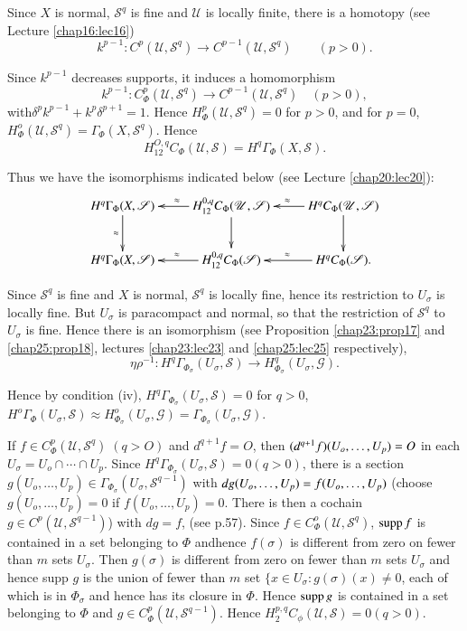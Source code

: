 Since $X$ is normal, $\mathscr{S}^q$ is fine and $\mathscr{U}$ is
locally finite, there is a homotopy (see Lecture \ref{chap16:lec16}) 
$$
k^{p-1}:C^p(\mathscr{U},\mathscr{S}^q) \to 
C^{p-1}(\mathscr{U},\mathscr{S}^q) \qquad (p>0). 
$$

Since $k^{p-1}$ decreases supports, it induces a homomorphism
$$
k^{p-1} : C^p_{\Phi} (\mathscr{U}, \mathscr{S}^q) \to C^{p-1}
(\mathscr{U}, \mathscr{S}^q) \quad (p > 0),
$$
with\pageoriginale $\delta^p k^{p-1} + k^p \delta^{p+1} = 1$. Hence $H^p_\Phi
(\mathscr{U}, \mathscr{S}^q)=0$ for $p>0$, and for $p=0$, $H^o_ \Phi
(\mathscr{U},\mathscr{S}^q)= \Gamma _\Phi (X, \mathscr{S}^q)$. Hence 
$$
H^{O,q}_{12}C_ \Phi (\mathscr{U},\mathscr{S})=H^q \Gamma _ \Phi
(X,\mathscr{S}). 
$$

Thus we have the isomorphisms indicated below (see Lecture
\ref{chap20:lec20}): 
\[
\xymatrix{
H^q\Gamma_{\Phi} (X,\mathscr{S}) \ar[d]_{\approx} & H^{0,q}_{12}
C_{\Phi} (\mathscr{U},\mathscr{S}) \ar[d] \ar[l]_{\approx} &
H^qC_{\Phi} (\mathscr{U},\mathscr{S})\ar[d]\ar[l]_{\approx}\\
H^q\Gamma_{\Phi} (X,\mathscr{S}) & H^{0,q}_{12} C_{\Phi} (\mathscr{S})
\ar[l]_{\approx} & H^qC_{\Phi} (\mathscr{S}) \ar[l]_{\approx}.
 }
\]

Since $\mathscr{S}^q$ is fine and $X$ is normal, $\mathscr{S}^q$ is
locally fine, hence its restriction to $U_ \sigma$ is locally
fine. But $U_\sigma$ is paracompact and normal, so that the
restriction of $\mathscr{S}^q$ to $U_ \sigma$ is fine. Hence there is
an isomorphism (see Proposition \ref{chap23:prop17} and
\ref{chap25:prop18}, lectures \ref{chap23:lec23} and \ref{chap25:lec25} 
respectively), 
$$
\eta \rho^{-1}: H^q\Gamma_{\Phi_ \sigma}(U_\sigma, \mathscr{S}) \to
H^q_{\Phi_ \sigma}(U_\sigma,\mathscr{G}). 
$$

\noindent
Hence by condition (iv), $H^q \Gamma_{\Phi_\sigma}(U_\sigma, \mathscr{S})=0$
for $q>0$, $H^o\Gamma_\Phi(U_\sigma, \mathscr{S}) \approx H^o_{\Phi_
  \sigma}(U_\sigma, \mathscr{G})= \Gamma_{\Phi_\sigma}(U_ \sigma,
\mathscr{G})$. 

If $f \in C^p_\Phi (\mathscr{U},\mathscr{S}^q) \; (q>O)$ and
$d^{q+1}f=O$, then $(d^{q+1}f)(U_o , \ldots,\break U_p)=O$ in each $U_\sigma
=U_o \cap \cdots \cap U_p$. Since $H^q \Gamma _{\Phi_\sigma}(U_
\sigma, \mathscr{S})=0(q>0)$, there is a section $g(U_o 
,\ldots ,U_p) \in \Gamma_{\Phi _\sigma}(U_ \sigma,
\mathscr{S}^{q-1})$ with $dg(U_o ,\ldots,\break U_p)=f(U_o ,\ldots ,U_p)$
(choose $g(U_o ,\ldots ,U_p)=0$ if $f(U_o ,\ldots ,U_p)=0$. There is
then a cochain $g \in C^p(\mathscr{U},\mathscr{S}^{q-1})$) with
$dg=f$, (see p.57). Since $f \in C^o_\Phi
(\mathscr{U},\mathscr{S}^q)$, $\operatorname{supp} f$ is contained in a set belonging
to $\Phi$ and\pageoriginale hence $f(\sigma)$ is different from zero
on fewer than 
$m$ sets $U_\sigma$. Then $g(\sigma)$ is different from zero on fewer
than $m$ sets $U_\sigma$ and hence supp $g$ is the union of fewer than
$m$ set $\{ x \in U_\sigma :g(\sigma)(x)\neq 0$, each of which is in
$\Phi_\sigma$ and hence has its closure in $\Phi$. Hence $\operatorname{supp} g$ is
contained in a set belonging to $\Phi$ and $g \in C^p_\Phi
(\mathscr{U},\mathscr{S}^{q-1})$. Hence $H^{p,q}_2 C_\phi
(\mathscr{U},\mathscr{S})=0 (q>0)$. 

